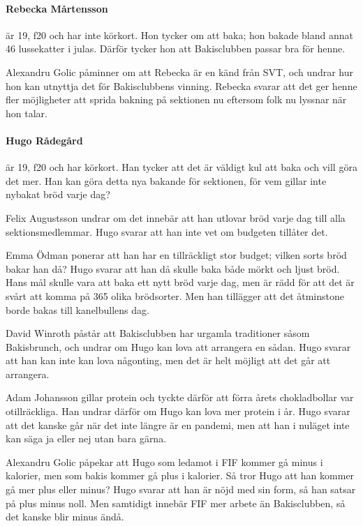 \documentclass[hidelinks]{sektionsmote}
\begin{document}
\paragraph{Rebecka Mårtensson} är 19, f20 och har inte körkort.
Hon tycker om att baka; hon bakade bland annat 46 lussekatter i julas.
Därför tycker hon att Bakisclubben passar bra för henne.

Alexandru Golic påminner om att Rebecka är en känd från SVT, och undrar hur hon kan utnyttja det för Bakisclubbens vinning.
Rebecka svarar att det ger henne fler möjligheter att sprida bakning på sektionen nu eftersom folk nu lyssnar när hon talar.

\paragraph{Hugo Rådegård} är 19, f20 och har körkort.
Han tycker att det är väldigt kul att baka och vill göra det mer.
Han kan göra detta nya bakande för sektionen, för vem gillar inte nybakat bröd varje dag?

Felix Augustsson undrar om det innebär att han utlovar bröd varje dag till alla sektionsmedlemmar.
Hugo svarar att han inte vet om budgeten tillåter det.

Emma Ödman ponerar att han har en tillräckligt stor budget; vilken sorts bröd bakar han då?
Hugo svarar att han då skulle baka både mörkt och ljust bröd.
Hans mål skulle vara att baka ett nytt bröd varje dag, men är rädd för att det är svårt att komma på 365 olika brödsorter.
Men han tillägger att det åtminstone borde bakas till kanelbullens dag.

David Winroth påstår att Bakisclubben har urgamla traditioner såsom Bakisbrunch, och undrar om Hugo kan lova att arrangera en sådan.
Hugo svarar att han kan inte kan lova någonting, men det är helt möjligt att det går att arrangera.

Adam Johansson gillar protein och tyckte därför att förra årets chokladbollar var otillräckliga.
Han undrar därför om Hugo kan lova mer protein i år.
Hugo svarar att det kanske går när det inte längre är en pandemi, men att han i nuläget inte kan säga ja eller nej utan bara gärna.

Alexandru Golic påpekar att Hugo som ledamot i FIF kommer gå minus i kalorier, men som bakis kommer gå plus i kalorier.
Så tror Hugo att han kommer gå mer plus eller minus?
Hugo svarar att han är nöjd med sin form, så han satsar på plus minus noll.
Men samtidigt innebär FIF mer arbete än Bakisclubben, så det kanske blir minus ändå.
\end{document}

